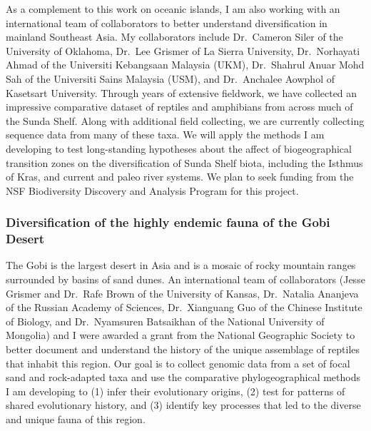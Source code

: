 As a complement to this work on oceanic islands, I am also working with an
international team of collaborators to better understand diversification in
mainland Southeast Asia.
My collaborators include
Dr.\ Cameron Siler of the University of Oklahoma,
Dr.\ Lee Grismer of La Sierra University,
Dr.\ Norhayati Ahmad of the Universiti
Kebangsaan Malaysia (UKM),
Dr.\ Shahrul Anuar Mohd Sah of the Universiti Sains Malaysia (USM),
and
Dr.\ Anchalee Aowphol of Kasetsart University.
Through years of extensive fieldwork, we have collected an impressive
comparative dataset of reptiles and amphibians from across much of the Sunda
Shelf.
Along with additional field collecting, we are currently collecting sequence
data from many of these taxa.
We will apply the methods I am developing to test long-standing hypotheses
about the affect of biogeographical transition zones on the diversification of
Sunda Shelf biota, including the Isthmus of Kras, and current and paleo river
systems.
We plan to seek funding from the NSF Biodiversity Discovery and Analysis
Program for this project.

\subsubsection*{Diversification of the highly endemic fauna of the Gobi Desert}
The Gobi is the largest desert in Asia and is a mosaic of rocky mountain ranges
surrounded by basins of sand dunes.
An international team of collaborators (Jesse Grismer and Dr.\ Rafe Brown of
the University of Kansas, Dr.\ Natalia Ananjeva of the Russian Academy of
Sciences, Dr.\ Xianguang Guo of the Chinese Institute of Biology, and Dr.\
Nyamsuren Batsaikhan of the National University of Mongolia) and I were awarded
a grant from the National Geographic Society to better document and understand
the history of the unique assemblage of reptiles that inhabit this region.
Our goal is to collect genomic data from a set of focal sand and rock-adapted
taxa and use the comparative phylogeographical methods I am developing to
(1) infer their evolutionary origins,
(2) test for patterns of shared evolutionary history, and
(3) identify key processes that led to the diverse and unique fauna of this
region.


